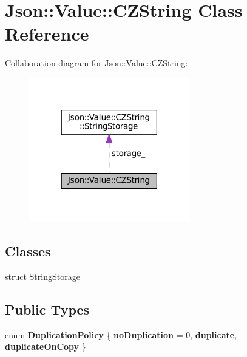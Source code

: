 \hypertarget{classJson_1_1Value_1_1CZString}{}\section{Json\+:\+:Value\+:\+:C\+Z\+String Class Reference}
\label{classJson_1_1Value_1_1CZString}


Collaboration diagram for Json\+:\+:Value\+:\+:C\+Z\+String\+:
\nopagebreak
\begin{figure}[H]
\begin{center}
\leavevmode
\includegraphics[width=198pt]{classJson_1_1Value_1_1CZString__coll__graph}
\end{center}
\end{figure}
\subsection*{Classes}
\begin{DoxyCompactItemize}
\item 
struct \hyperlink{structJson_1_1Value_1_1CZString_1_1StringStorage}{String\+Storage}
\end{DoxyCompactItemize}
\subsection*{Public Types}
\begin{DoxyCompactItemize}
\item 
\mbox{\label{classJson_1_1Value_1_1CZString_a2805c46fb4a72bbaed55de6d75941b6d}} 
enum {\bfseries Duplication\+Policy} \{ {\bfseries no\+Duplication} = 0, 
{\bfseries duplicate}, 
{\bfseries duplicate\+On\+Copy}
 \}
\end{DoxyCompactItemize}
